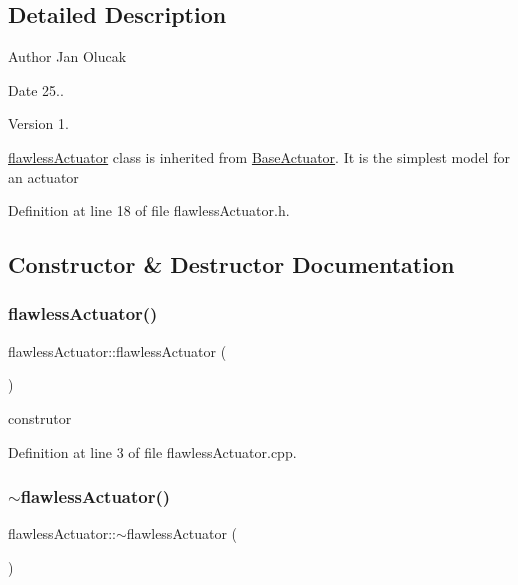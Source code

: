 \subsection{Detailed Description}
\begin{DoxyAuthor}{Author}
Jan Olucak 
\end{DoxyAuthor}
\begin{DoxyDate}{Date}
25.. 
\end{DoxyDate}
\begin{DoxyVersion}{Version}
1.
\end{DoxyVersion}
\hyperlink{classflawless_actuator}{flawless\+Actuator} class is inherited from \hyperlink{class_base_actuator}{Base\+Actuator}. It is the simplest model for an actuator 

Definition at line 18 of file flawless\+Actuator.\+h.



\subsection{Constructor \& Destructor Documentation}
\mbox{\label{classflawless_actuator_a73fc69c36971b5ffc8c9c7d135f1bb30}} 
\subsubsection{\texorpdfstring{flawless\+Actuator()}{flawlessActuator()}}
{\footnotesize\ttfamily flawless\+Actuator\+::flawless\+Actuator (\begin{DoxyParamCaption}{ }\end{DoxyParamCaption})}



construtor 



Definition at line 3 of file flawless\+Actuator.\+cpp.

\mbox{\label{classflawless_actuator_a3a37f5cff70fd61354dc25aa4bfe2466}} 
\subsubsection{\texorpdfstring{$\sim$flawless\+Actuator()}{~flawlessActuator()}}
{\footnotesize\ttfamily flawless\+Actuator\+::$\sim$flawless\+Actuator (\begin{DoxyParamCaption}{ }\end{DoxyParamCaption})}



